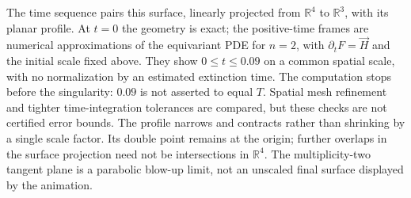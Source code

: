 \begin{example}
The time sequence pairs this surface, linearly projected from $\mathbb R^4$ to $\mathbb R^3$, with its planar profile. At $t=0$ the geometry is exact; the positive-time frames are numerical approximations of the equivariant PDE for $n=2$, with $\partial_tF=\vec H$ and the initial scale fixed above. They show $0\leq t\leq0.09$ on a common spatial scale, with no normalization by an estimated extinction time. The computation stops before the singularity: $0.09$ is not asserted to equal $T$. Spatial mesh refinement and tighter time-integration tolerances are compared, but these checks are not certified error bounds. The profile narrows and contracts rather than shrinking by a single scale factor. Its double point remains at the origin; further overlaps in the surface projection need not be intersections in $\mathbb R^4$. The multiplicity-two tangent plane is a parabolic blow-up limit, not an unscaled final surface displayed by the animation.
\end{example}

